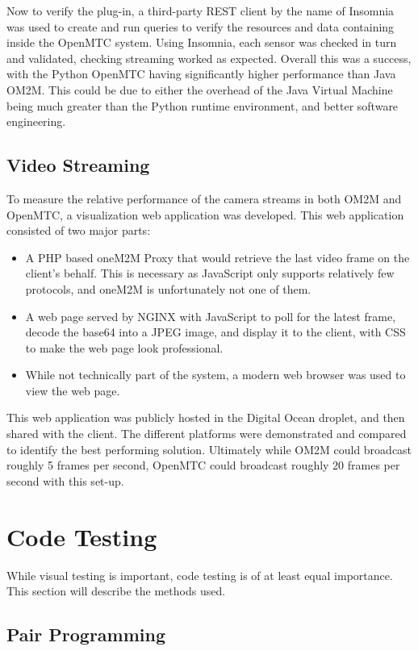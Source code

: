 Now to verify the plug-in, a third-party REST client by the name of Insomnia was used to create and run queries to verify the resources and data containing inside the OpenMTC system. Using Insomnia, each sensor was checked in turn and validated, checking streaming worked as expected. Overall this was a success, with the Python OpenMTC having significantly higher performance than Java OM2M. This could be due to either the overhead of the Java Virtual Machine being much greater than the Python runtime environment, and better software engineering.

\subsection{Video Streaming}

To measure the relative performance of the camera streams in both OM2M and OpenMTC, a visualization web application was developed. This web application consisted of two major parts:

\begin{itemize}
\item A PHP based oneM2M Proxy that would retrieve the last video frame on the client's behalf. This is necessary as JavaScript only supports relatively few protocols, and oneM2M is unfortunately not one of them.
\item A web page served by NGINX with JavaScript to poll for the latest frame, decode the base64 into a JPEG image, and display it to the client, with CSS to make the web page look professional.
\item While not technically part of the system, a modern web browser was used to view the web page.
\end{itemize}

This web application was publicly hosted in the Digital Ocean droplet, and then shared with the client. The different platforms were demonstrated and compared to identify the best performing solution. Ultimately while OM2M could broadcast roughly 5 frames per second, OpenMTC could broadcast roughly 20 frames per second with this set-up.

\section{Code Testing}

While visual testing is important, code testing is of at least equal importance. This section will describe the methods used.

\subsection{Pair Programming}

